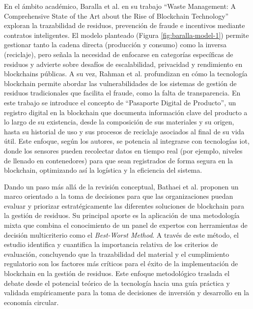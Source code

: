 En el ámbito académico, Baralla et al. en su trabajo ``Waste Management: A Comprehensive State of the Art about the Rise of Blockchain Technology'' \cite{baralla2023waste} exploran la trazabilidad de residuos, prevención de fraude e incentivos mediante contratos inteligentes. El modelo planteado (Figura \ref{fig:baralla-model-1}) permite gestionar tanto la cadena directa (producción y consumo) como la inversa (reciclaje), pero señala la necesidad de enfocarse en categorías específicas de residuos y advierte sobre desafíos de escalabilidad, privacidad y rendimiento en blockchains públicas. A su vez, Rahman et al. \cite{rahman2025traceable} profundizan en cómo la tecnología blockchain permite abordar las vulnerabilidades de los sistemas de gestión de residuos tradicionales que facilita el fraude, como la falta de transparencia. En este trabajo se introduce el concepto de ``Pasaporte Digital de Producto'', un registro digital en la blockchain que documenta información clave del producto a lo largo de su existencia, desde la composición de sus materiales y su origen, hasta su historial de uso y sus procesos de reciclaje asociados al final de su vida útil. Este enfoque, según los autores, se potencia al integrarse con tecnologías \acrshort{iot}, donde los sensores pueden recolectar datos en tiempo real (por ejemplo, niveles de llenado en contenedores) para que sean registrados de forma segura en la blockchain, optimizando así la logística y la eficiencia del sistema.

Dando un paso más allá de la revisión conceptual, Bathaei et al. \cite{bathaei2025blockchain} proponen un marco orientado a la toma de decisiones para que las organizaciones puedan evaluar y priorizar estratégicamente las diferentes soluciones de blockchain para la gestión de residuos. Su principal aporte es la aplicación de una metodología mixta que combina el conocimiento de un panel de expertos con herramientas de decisión multicriterio como el \textit{Best-Worst Method}. A través de este método, el estudio identifica y cuantifica la importancia relativa de los criterios de evaluación, concluyendo que la trazabilidad del material y el cumplimiento regulatorio son los factores más críticos para el éxito de la implementación de blockchain en la gestión de residuos. Este enfoque metodológico traslada el debate desde el potencial teórico de la tecnología hacia una guía práctica y validada empíricamente para la toma de decisiones de inversión y desarrollo en la economía circular.


